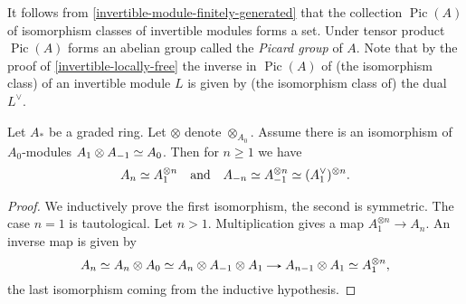 \newcommand{\Pic}{\operatorname{Pic}}
\begin{definition}
  It follows from \eqref{invertible-module-finitely-generated} that the
  collection $\Pic(A)$ of isomorphism classes of invertible modules
  forms a set. Under tensor product $\Pic(A)$ forms an abelian group
  called the \emph{Picard group} of $A$. Note that by the proof of
  \eqref{invertible-locally-free} the inverse in $\Pic(A)$ of (the
  isomorphism class) of an invertible module $L$ is given by (the
  isomorphism class of) the dual $L^\vee$.
\end{definition}

\begin{lemma}
  \label{graded-ring-invertible-components}
  Let $A_*$ be a graded ring. Let $\otimes$ denote
  $\otimes_{A_0}$. Assume there is an isomorphism of $A_0$-modules
  $A_1 \otimes A_{-1} \simeq A_0$. Then for $n \ge 1$ we have
  \[
  A_n \simeq A_1^{\otimes n} \quad\text{and}\quad
  A_{-n} \simeq A_{-1}^{\otimes n} \simeq (A_1^\vee)^{\otimes n}.
  \]
\end{lemma}

\begin{proof}
  We inductively prove the first isomorphism, the second is
  symmetric. The case $n=1$ is tautological. Let $n > 1$.
  Multiplication gives a map $A_1^{\otimes n} \to A_n$. An inverse map
  is given by
  \[
  A_n \iso A_n \otimes A_0 \iso A_n \otimes A_{-1} \otimes A_1 \to
  A_{n-1} \otimes A_1 \iso A_1^{\otimes n},
  \]
  the last isomorphism coming from the inductive hypothesis.
\end{proof}


